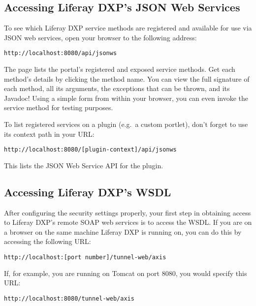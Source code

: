 \subsection{Accessing Liferay DXP's JSON Web
Services}\label{accessing-liferay-dxps-json-web-services}

To see which Liferay DXP service methods are registered and available
for use via JSON web services, open your browser to the following
address:

\begin{verbatim}
http://localhost:8080/api/jsonws
\end{verbatim}

The page lists the portal's registered and exposed service methods. Get
each method's details by clicking the method name. You can view the full
signature of each method, all its arguments, the exceptions that can be
thrown, and its Javadoc! Using a simple form from within your browser,
you can even invoke the service method for testing purposes.

To list registered services on a plugin (e.g.~a custom portlet), don't
forget to use its context path in your URL:

\begin{verbatim}
http://localhost:8080/[plugin-context]/api/jsonws
\end{verbatim}

This lists the JSON Web Service API for the plugin.

\subsection{Accessing Liferay DXP's
WSDL}\label{accessing-liferay-dxps-wsdl}

After configuring the security settings properly, your first step in
obtaining access to Liferay DXP's remote SOAP web services is to access
the WSDL. If you are on a browser on the same machine Liferay DXP is
running on, you can do this by accessing the following URL:

\begin{verbatim}
http://localhost:[port number]/tunnel-web/axis
\end{verbatim}

If, for example, you are running on Tomcat on port 8080, you would
specify this URL:

\begin{verbatim}
http://localhost:8080/tunnel-web/axis
\end{verbatim}

